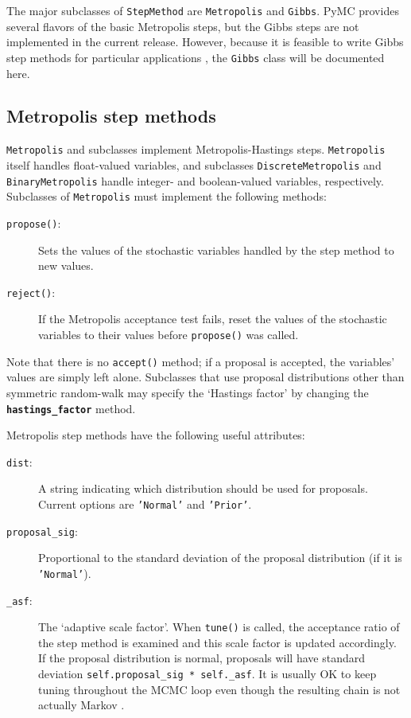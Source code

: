 The major subclasses of \texttt{StepMethod} are \texttt{Metropolis} and \texttt{Gibbs}. PyMC provides several flavors of the basic Metropolis steps, but the Gibbs steps are not implemented in the current release. However, because it is feasible to write Gibbs step methods for particular applications , the \texttt{Gibbs} class will be documented here.


\subsection{Metropolis step methods}
\texttt{Metropolis} and subclasses implement Metropolis-Hastings steps. \texttt{Metropolis} itself handles float-valued variables, and subclasses \texttt{DiscreteMetropolis} and \texttt{BinaryMetropolis} handle integer- and boolean-valued variables, respectively. Subclasses of \texttt{Metropolis} must implement the following methods:
\begin{description}
    \item[\texttt{propose()}:] Sets the values of the stochastic variables handled by the step method to new values.
    \item[\texttt{reject()}:] If the Metropolis acceptance test fails, reset the values of the stochastic variables to their values before \texttt{propose()} was called.
\end{description}
Note that there is no \texttt{accept()} method; if a proposal is accepted, the variables' values are simply left alone. Subclasses that use proposal distributions other than symmetric random-walk may specify the `Hastings factor' by changing the \textbf{\texttt{hastings_factor}} method.

Metropolis step methods have the following useful attributes:
\begin{description}
    \item[\texttt{dist}:] A string indicating which distribution should be used for proposals. Current options are \texttt{'Normal'} and \texttt{'Prior'}.
    \item[\texttt{proposal\_sig}:] Proportional to the standard deviation of the proposal distribution (if it is \texttt{'Normal'}).
    \item[\texttt{\_asf}:] The `adaptive scale factor'. When \texttt{tune()} is called, the acceptance ratio of the step method is examined and this scale factor is updated accordingly. If the proposal distribution is normal, proposals will have standard deviation \texttt{self.proposal\_sig * self.\_asf}. It is usually OK to keep tuning throughout the MCMC loop even though the resulting chain is not actually Markov \cite{tuning}. 
\end{description}

